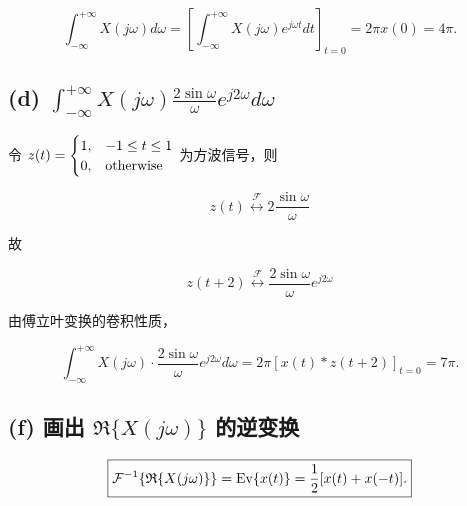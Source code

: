 \documentclass[11pt]{article}
\begin{document}
\[\boxed{
\int_{-\infty}^{+\infty}X(j\omega) d\omega = \left[\int_{-\infty}^{+\infty}X(j\omega)e^{j\omega t}dt\right]_{t = 0} = 2\pi x(0) = 4\pi.}
\]

\subsection{\texorpdfstring{(d)
\(\int_{-\infty}^{+\infty}X(j\omega) \frac{2\sin \omega}{\omega}e^{j2\omega} d\omega\)}{(d) \textbackslash int\_\{-\textbackslash infty\}\^{}\{+\textbackslash infty\}X(j\textbackslash omega) \textbackslash frac\{2\textbackslash sin \textbackslash omega\}\{\textbackslash omega\}e\^{}\{j2\textbackslash omega\} d\textbackslash omega}}\label{d-int_-inftyinftyxjomega-frac2sin-omegaomegaej2omega-domega}

令
\(z(t) = \begin{cases} 1, & -1\le t\le 1 \\ 0, & \rm otherwise\end{cases}\)
为方波信号，则

\[
z(t) \stackrel{\mathcal{F}}{\longleftrightarrow } 2\frac{\sin \omega}{\omega}
\]

故

\[
z(t+2) \stackrel{\mathcal{F}} {\longleftrightarrow} \frac{2\sin \omega}{\omega}e^{j2\omega}
\]

由傅立叶变换的卷积性质，

\[\boxed{
\int_{-\infty}^{+\infty} X(j\omega)\cdot \frac{2\sin\omega}{\omega}e^{j2\omega} d\omega = 2\pi [x(t)*z(t+2)]_{t = 0} = 7\pi.}
\]

\subsection{\texorpdfstring{(f) 画出 \(\mathfrak{R}\{X(j\omega)\}\)
的逆变换}{(f) 画出 \textbackslash mathfrak\{R\}\textbackslash\{X(j\textbackslash omega)\textbackslash\} 的逆变换}}\label{f-ux753bux51fa-mathfrakrxjomega-ux7684ux9006ux53d8ux6362}

\[\boxed{
\mathcal{F}^{-1} \{\mathfrak{R}\{X(j\omega)\}\} = {\rm Ev}\{x(t)\} = \frac{1}{2}[x(t) + x(-t)].}
\]
\end{document}
